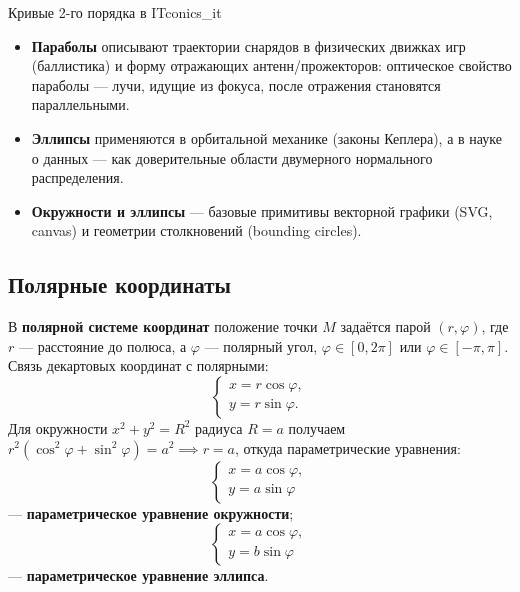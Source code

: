 \documentclass[12pt,a4paper]{article}
\begin{document}
\begin{remarkIT}{Кривые 2-го порядка в IT}{conics_it}
  \begin{itemize}
    \item \textbf{Параболы} описывают траектории снарядов в физических
      движках игр (баллистика) и форму отражающих антенн/прожекторов:
      оптическое свойство параболы — лучи, идущие из фокуса, после
      отражения становятся параллельными.
    \item \textbf{Эллипсы} применяются в орбитальной механике (законы
      Кеплера), а в науке о данных — как доверительные области
      двумерного нормального распределения.
    \item \textbf{Окружности и эллипсы} — базовые примитивы векторной
      графики (SVG, canvas) и геометрии столкновений (bounding circles).
  \end{itemize}
\end{remarkIT}

\subsection*{Полярные координаты}

В \textbf{полярной системе координат} положение точки $M$ задаётся парой
$(r, \varphi)$, где $r$ — расстояние до полюса, а $\varphi$ — полярный угол,
$\varphi \in [0, 2\pi]$ или $\varphi \in [-\pi, \pi]$. Связь декартовых
координат с полярными:
\[
  \begin{cases}
    x = r\cos\varphi, \\
    y = r\sin\varphi.
  \end{cases}
\]
Для окружности $x^2 + y^2 = R^2$ радиуса $R = a$ получаем
$r^2(\cos^2\varphi + \sin^2\varphi) = a^2 \implies r = a$, откуда
параметрические уравнения:
\begin{equation}
  \begin{cases}
    x = a\cos\varphi, \\
    y = a\sin\varphi
  \end{cases} \tag{9.20}
\end{equation}
— \textbf{параметрическое уравнение окружности};
\begin{equation}
  \begin{cases}
    x = a\cos\varphi, \\
    y = b\sin\varphi
  \end{cases} \tag{9.21}
\end{equation}
— \textbf{параметрическое уравнение эллипса}.
\end{document}
